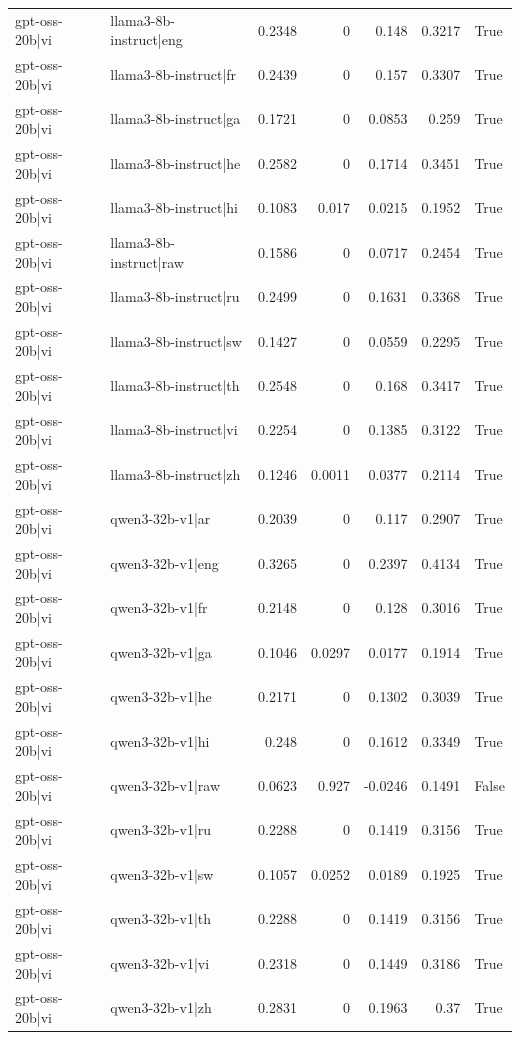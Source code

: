\begin{table}
\begin{tabular}{l l r r r r l}
gpt-oss-20b|vi & llama3-8b-instruct|eng & 0.2348 & 0 & 0.148 & 0.3217 & True \\
gpt-oss-20b|vi & llama3-8b-instruct|fr & 0.2439 & 0 & 0.157 & 0.3307 & True \\
gpt-oss-20b|vi & llama3-8b-instruct|ga & 0.1721 & 0 & 0.0853 & 0.259 & True \\
gpt-oss-20b|vi & llama3-8b-instruct|he & 0.2582 & 0 & 0.1714 & 0.3451 & True \\
gpt-oss-20b|vi & llama3-8b-instruct|hi & 0.1083 & 0.017 & 0.0215 & 0.1952 & True \\
gpt-oss-20b|vi & llama3-8b-instruct|raw & 0.1586 & 0 & 0.0717 & 0.2454 & True \\
gpt-oss-20b|vi & llama3-8b-instruct|ru & 0.2499 & 0 & 0.1631 & 0.3368 & True \\
gpt-oss-20b|vi & llama3-8b-instruct|sw & 0.1427 & 0 & 0.0559 & 0.2295 & True \\
gpt-oss-20b|vi & llama3-8b-instruct|th & 0.2548 & 0 & 0.168 & 0.3417 & True \\
gpt-oss-20b|vi & llama3-8b-instruct|vi & 0.2254 & 0 & 0.1385 & 0.3122 & True \\
gpt-oss-20b|vi & llama3-8b-instruct|zh & 0.1246 & 0.0011 & 0.0377 & 0.2114 & True \\
gpt-oss-20b|vi & qwen3-32b-v1|ar & 0.2039 & 0 & 0.117 & 0.2907 & True \\
gpt-oss-20b|vi & qwen3-32b-v1|eng & 0.3265 & 0 & 0.2397 & 0.4134 & True \\
gpt-oss-20b|vi & qwen3-32b-v1|fr & 0.2148 & 0 & 0.128 & 0.3016 & True \\
gpt-oss-20b|vi & qwen3-32b-v1|ga & 0.1046 & 0.0297 & 0.0177 & 0.1914 & True \\
gpt-oss-20b|vi & qwen3-32b-v1|he & 0.2171 & 0 & 0.1302 & 0.3039 & True \\
gpt-oss-20b|vi & qwen3-32b-v1|hi & 0.248 & 0 & 0.1612 & 0.3349 & True \\
gpt-oss-20b|vi & qwen3-32b-v1|raw & 0.0623 & 0.927 & -0.0246 & 0.1491 & False \\
gpt-oss-20b|vi & qwen3-32b-v1|ru & 0.2288 & 0 & 0.1419 & 0.3156 & True \\
gpt-oss-20b|vi & qwen3-32b-v1|sw & 0.1057 & 0.0252 & 0.0189 & 0.1925 & True \\
gpt-oss-20b|vi & qwen3-32b-v1|th & 0.2288 & 0 & 0.1419 & 0.3156 & True \\
gpt-oss-20b|vi & qwen3-32b-v1|vi & 0.2318 & 0 & 0.1449 & 0.3186 & True \\
gpt-oss-20b|vi & qwen3-32b-v1|zh & 0.2831 & 0 & 0.1963 & 0.37 & True \\

\end{tabular}
\end{table}
